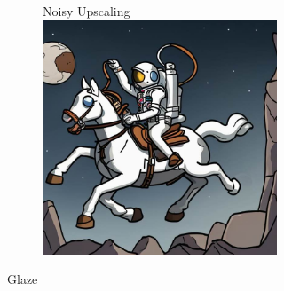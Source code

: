 \documentclass{article}
\begin{document}
\begin{figure}[h]
\begin{subfigure}[t]{\textwidth}
\begin{subfigure}[b]{0.19\textwidth}
     \end{subfigure}
     \hfill
     \begin{subfigure}[b]{0.19\textwidth}
         \centering
         Noisy Upscaling\vspace{0.3em}
         \includegraphics[width=\textwidth]{plots/process/generations/glaze/upscale.jpeg}
     \end{subfigure}
    \caption{Glaze}
    \vspace{0.5em}
    \end{subfigure}
    \begin{subfigure}[t]{\textwidth}
        \begin{subfigure}[b]{0.19\textwidth}
         \centering
         

\end{subfigure}
\end{subfigure}
\end{figure}
\end{document}
